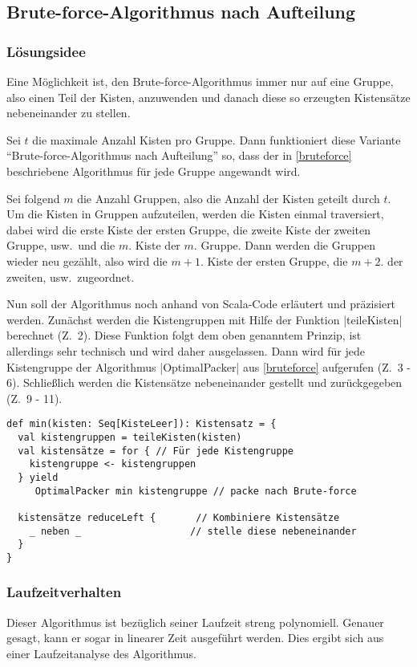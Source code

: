 \subsection{Brute-force-Algorithmus nach Aufteilung}
\label{auf}
\subsubsection{Lösungsidee}
 Eine Möglichkeit ist, den Brute-force-Algorithmus immer nur auf eine Gruppe,
  also einen Teil der Kisten, anzuwenden und danach diese so erzeugten Kistensätze nebeneinander zu stellen.
 
 Sei $t$ die maximale Anzahl Kisten pro Gruppe.
 Dann funktioniert diese Variante ``Brute-force-Al\-go\-rith\-mus nach Aufteilung'' so,
 dass der in \ref{bruteforce} beschriebene Algorithmus für jede Gruppe angewandt wird.

 Sei folgend $m$ die Anzahl Gruppen, also die Anzahl der Kisten geteilt durch $t$.
 Um die Kisten in Gruppen aufzuteilen, werden die Kisten einmal traversiert,
 dabei wird die erste Kiste der ersten Gruppe, die zweite Kiste der zweiten Gruppe, usw.\ und die $m.$ Kiste der $m.$ Gruppe.
 Dann werden die Gruppen wieder neu gezählt, also wird die $m+1.$ Kiste der ersten Gruppe, die $m+2.$ der zweiten, usw.\ zugeordnet.

 Nun soll der Algorithmus noch anhand von Scala-Code erläutert und präzisiert werden.
 Zunächst werden die Kistengruppen mit Hilfe der Funktion |teileKisten| berechnet (Z.\ 2).
 Diese Funktion folgt dem oben genanntem Prinzip, ist allerdings sehr technisch und wird daher ausgelassen.
 Dann wird für jede Kistengruppe der Algorithmus |OptimalPacker| aus \ref{bruteforce} aufgerufen (Z.\ 3 - 6).
 Schließlich werden die Kistensätze nebeneinander gestellt und zurückgegeben (Z.\ 9 - 11).
\begin{lstlisting}
def min(kisten: Seq[KisteLeer]): Kistensatz = {
  val kistengruppen = teileKisten(kisten)
  val kistensätze = for { // Für jede Kistengruppe
    kistengruppe <- kistengruppen
  } yield
     OptimalPacker min kistengruppe // packe nach Brute-force
  
  kistensätze reduceLeft {       // Kombiniere Kistensätze
    _ neben _                   // stelle diese nebeneinander
  }
}
\end{lstlisting}

\subsubsection{Laufzeitverhalten}
 Dieser Algorithmus ist bezüglich seiner Laufzeit streng polynomiell. Genauer gesagt, kann er sogar in linearer Zeit ausgeführt werden.
 Dies ergibt sich aus einer Laufzeitanalyse des Algorithmus.

